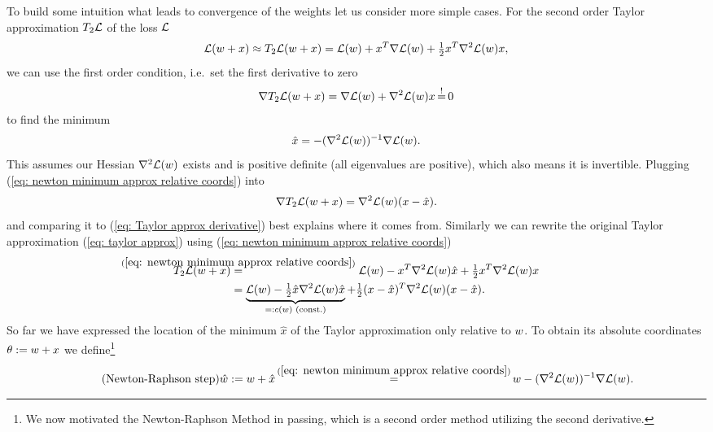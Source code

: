To build some intuition what leads to convergence of the weights let us consider
more simple cases. For the second order Taylor approximation \(T_2\mathcal{L}\) of the
loss \(\mathcal{L}\)
%
\begin{align}\label{eq: taylor approx}
	\mathcal{L}(w+x) \approx T_2\mathcal{L}(w+x)
	= \mathcal{L}(w) + x^T \nabla \mathcal{L}(w) + \tfrac12 x^T \nabla^2 \mathcal{L}(w) x,
\end{align}
%
we can use the first order condition, i.e.\ set the first derivative to zero
%
\begin{align}\label{eq: Taylor approx derivative}
	\nabla T_2\Loss(\weights+x) = \nabla \Loss(\weights) + \nabla^2\Loss(\weights) x \xeq{!} 0
\end{align}
%
to find the minimum 
%
\begin{align}\label{eq: newton minimum approx relative coords}
	\hat{x} = -(\nabla^2 \mathcal{L}(w))^{-1}\nabla \mathcal{L}(w).
\end{align}
%
This assumes our Hessian \(\nabla^2 \mathcal{L}(w)\) exists and is
positive definite (all eigenvalues are positive), which also means it is invertible.
Plugging (\ref{eq: newton minimum approx relative coords}) into
%
\begin{align*}
	\nabla T_2\mathcal{L}(w+x) = \nabla^2 \mathcal{L}(w)(x-\hat{x}).
\end{align*}
%
and comparing it to (\ref{eq: Taylor approx derivative})
best explains where it comes from.
Similarly we can rewrite the original Taylor approximation (\ref{eq: taylor
approx}) using (\ref{eq: newton minimum approx relative coords})
%
\begin{align*}
	T_2\Loss(\weights+x)
	&\lxeq{(\ref{eq: newton minimum approx relative coords})} \Loss(\weights) - x^T \nabla^2 \Loss(\weights) \hat{x} + \tfrac12 x^T \nabla^2 \Loss(\weights) x \\
	&= \underbrace{
		\Loss(\weights) - \tfrac12 \hat{x} \nabla^2 \Loss(\weights) \hat{x}
	}_{
		=: c(\weights) \text{ (const.)}
	} + \tfrac12 (x-\hat{x})^T \nabla^2 \Loss(\weights)(x-\hat{x}).
\end{align*}
%
So far we have expressed the location of the minimum \(\hat{x}\) of the Taylor
approximation only relative to \(w\). To obtain its absolute coordinates
\(\theta:=w+x\) we define\footnote{
	We now motivated the Newton-Raphson Method in passing, which is a second
	order method utilizing the second derivative.
}
%
\begin{align}\label{eq: newton minimum approx}
	\tag{Newton-Raphson step}
	\hat{\weights} := \weights + \hat{x}
	\xeq{(\ref{eq: newton minimum approx relative coords})}
	\weights -(\nabla^2 \Loss(\weights))^{-1}\nabla \Loss(\weights).
\end{align}
